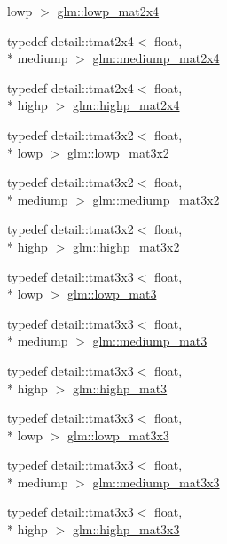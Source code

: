 \begin{DoxyCompactItemize}
lowp $>$ \hyperlink{group__core__precision_gaa62e33ee2864909c8522a549fbf40ce5}{glm\-::lowp\-\_\-mat2x4}
\item 
typedef detail\-::tmat2x4$<$ float, \\*
mediump $>$ \hyperlink{group__core__precision_gae90cf4be1ded03a3a5b7b42045da253c}{glm\-::mediump\-\_\-mat2x4}
\item 
typedef detail\-::tmat2x4$<$ float, \\*
highp $>$ \hyperlink{group__core__precision_ga3cc506666b7a95db56f9d2eb787b6e20}{glm\-::highp\-\_\-mat2x4}
\item 
typedef detail\-::tmat3x2$<$ float, \\*
lowp $>$ \hyperlink{group__core__precision_ga17219f89f804dbf4620d4caacf32cfe2}{glm\-::lowp\-\_\-mat3x2}
\item 
typedef detail\-::tmat3x2$<$ float, \\*
mediump $>$ \hyperlink{group__core__precision_ga1215b70c2750b6e9ab813ced8dcae568}{glm\-::mediump\-\_\-mat3x2}
\item 
typedef detail\-::tmat3x2$<$ float, \\*
highp $>$ \hyperlink{group__core__precision_gabc7767293ff69cd56717ee9d8be62963}{glm\-::highp\-\_\-mat3x2}
\item 
typedef detail\-::tmat3x3$<$ float, \\*
lowp $>$ \hyperlink{group__core__precision_gaae2935658c6a3668ac1935a7f6064d51}{glm\-::lowp\-\_\-mat3}
\item 
typedef detail\-::tmat3x3$<$ float, \\*
mediump $>$ \hyperlink{group__core__precision_gacf45e22f1fb2703b181995676963a1f9}{glm\-::mediump\-\_\-mat3}
\item 
typedef detail\-::tmat3x3$<$ float, \\*
highp $>$ \hyperlink{group__core__precision_ga334034520a655db41a2e188951f6aaad}{glm\-::highp\-\_\-mat3}
\item 
typedef detail\-::tmat3x3$<$ float, \\*
lowp $>$ \hyperlink{group__core__precision_ga31688b397d10806ead332c3adb7dc0f0}{glm\-::lowp\-\_\-mat3x3}
\item 
typedef detail\-::tmat3x3$<$ float, \\*
mediump $>$ \hyperlink{group__core__precision_gae4c7f0d5d3dab712f9a671183e63e5ab}{glm\-::mediump\-\_\-mat3x3}
\item 
typedef detail\-::tmat3x3$<$ float, \\*
highp $>$ \hyperlink{group__core__precision_ga8a3703cc71cdfc8928eddf46b3763c4b}{glm\-::highp\-\_\-mat3x3}

\end{DoxyCompactItemize}
